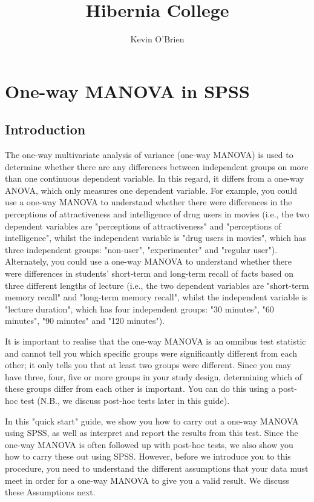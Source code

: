 \documentclass[12pt]{article} %
\title{Hibernia College}
\author{Kevin O'Brien}
\begin{document}
\maketitle

\section{One-way MANOVA in SPSS}

\subsection{Introduction}
The one-way multivariate analysis of variance (one-way MANOVA) is used to determine whether there are any differences between independent groups on more than one continuous dependent variable. In this regard, it differs from a one-way ANOVA, which only measures one dependent variable. For example, you could use a one-way MANOVA to understand whether there were differences in the perceptions of attractiveness and intelligence of drug users in movies (i.e., the two dependent variables are "perceptions of attractiveness" and "perceptions of intelligence", whilst the independent variable is "drug users in movies", which has three independent groups: "non-user", "experimenter" and "regular user"). Alternately, you could use a one-way MANOVA to understand whether there were differences in students' short-term and long-term recall of facts based on three different lengths of lecture (i.e., the two dependent variables are "short-term memory recall" and "long-term memory recall", whilst the independent variable is "lecture duration", which has four independent groups: "30 minutes", "60 minutes", "90 minutes" and "120 minutes").

It is important to realise that the one-way MANOVA is an omnibus test statistic and cannot tell you which specific groups were significantly different from each other; it only tells you that at least two groups were different. Since you may have three, four, five or more groups in your study design, determining which of these groups differ from each other is important. You can do this using a post-hoc test (N.B., we discuss post-hoc tests later in this guide).

In this "quick start" guide, we show you how to carry out a one-way MANOVA using SPSS, as well as interpret and report the results from this test. Since the one-way MANOVA is often followed up with post-hoc tests, we also show you how to carry these out using SPSS. However, before we introduce you to this procedure, you need to understand the different assumptions that your data must meet in order for a one-way MANOVA to give you a valid result. We discuss these  Assumptions next.
\end{document}
